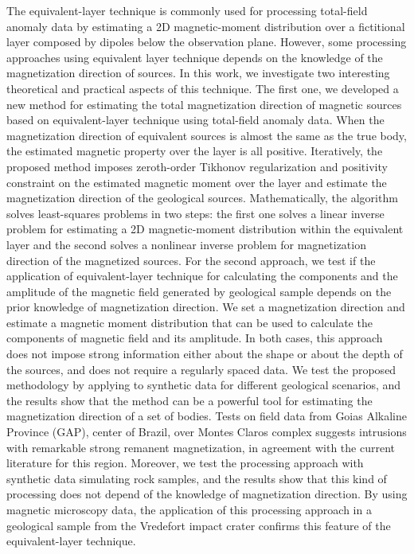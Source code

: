\begin{foreignabstract}
The equivalent-layer technique is commonly used for processing total-field anomaly data by estimating a 2D magnetic-moment distribution over a fictitional layer composed by dipoles below the observation plane. However, some processing approaches using equivalent layer technique depends on the knowledge of the magnetization direction of sources. In this work, we investigate two interesting theoretical and practical aspects of this technique. The first one, we developed a new method for estimating the total magnetization direction of magnetic sources based on equivalent-layer technique using total-field anomaly data. When the magnetization direction of equivalent sources is almost the same as the true body, the estimated magnetic property over the layer is all positive. Iteratively, the proposed method imposes zeroth-order Tikhonov regularization and positivity constraint on the estimated magnetic moment over the layer and estimate the magnetization direction of the geological sources. Mathematically, the algorithm solves least-squares problems in two steps: the first one solves a linear inverse problem for estimating a 2D magnetic-moment distribution within the equivalent layer and the second solves a nonlinear inverse problem for magnetization direction of the magnetized sources. For the second approach, we test if the application of equivalent-layer technique for calculating the components and the amplitude of the magnetic field generated by geological sample depends on the prior knowledge of magnetization direction. We set a magnetization direction and estimate a magnetic moment distribution that can be used to calculate the components of magnetic field and its amplitude. In both cases, this approach does not impose strong information either about the shape or about the depth of the sources, and does not require a regularly spaced data. We test the proposed methodology by applying to synthetic data for different geological scenarios, and the results show that the method can be a powerful tool for estimating the magnetization direction of a set of bodies. Tests on field data from Goias Alkaline Province (GAP), center of Brazil, over Montes Claros complex suggests intrusions with remarkable strong remanent magnetization, in agreement with the current literature for this region. Moreover, we test the processing approach with synthetic data simulating rock samples, and the results show that this kind of processing does not depend of the knowledge of magnetization direction. By using magnetic microscopy data, the application of this processing approach in a geological sample from the Vredefort impact crater confirms this feature of the equivalent-layer technique.   
\end{foreignabstract}